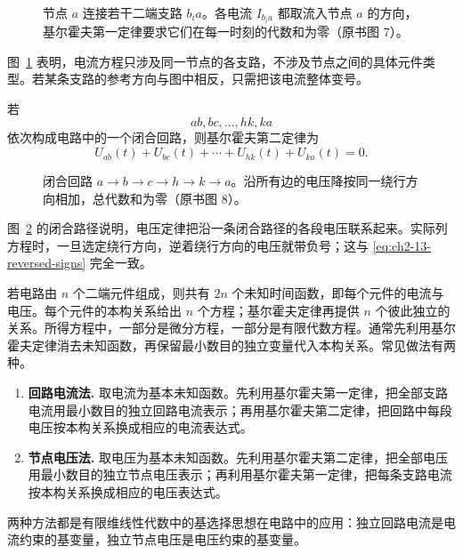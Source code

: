 \begin{figure}[H]
 \centering
 \resizebox{0.55\textwidth}{!}{}
 \caption{节点 \(a\) 连接若干二端支路 \(b_i a\)。各电流 \(I_{b_i a}\) 都取流入节点 \(a\) 的方向，基尔霍夫第一定律要求它们在每一时刻的代数和为零（原书图 7）。}
 \label{fig:ch2-13-kcl}
\end{figure}

图~\ref{fig:ch2-13-kcl} 表明，电流方程只涉及同一节点的各支路，不涉及节点之间的具体元件类型。若某条支路的参考方向与图中相反，只需把该电流整体变号。

若
\[
 ab,bc,\ldots,hk,ka
\]
依次构成电路中的一个闭合回路，则基尔霍夫第二定律为
\begin{equation}
 U_{ab}(t)+U_{bc}(t)+\cdots+U_{hk}(t)+U_{ka}(t)=0.
 \label{eq:ch2-13-loop-voltage}
\end{equation}

\begin{figure}[H]
 \centering
 \resizebox{0.55\textwidth}{!}{}
 \caption{闭合回路 \(a\to b\to c\to h\to k\to a\)。沿所有边的电压降按同一绕行方向相加，总代数和为零（原书图 8）。}
 \label{fig:ch2-13-kvl}
\end{figure}

图~\ref{fig:ch2-13-kvl} 的闭合路径说明，电压定律把沿一条闭合路径的各段电压联系起来。实际列方程时，一旦选定绕行方向，逆着绕行方向的电压就带负号；这与 \eqref{eq:ch2-13-reversed-signs} 完全一致。

若电路由 \(n\) 个二端元件组成，则共有 \(2n\) 个未知时间函数，即每个元件的电流与电压。每个元件的本构关系给出 \(n\) 个方程；基尔霍夫定律再提供 \(n\) 个彼此独立的关系。所得方程中，一部分是微分方程，一部分是有限代数方程。通常先利用基尔霍夫定律消去未知函数，再保留最小数目的独立变量代入本构关系。常见做法有两种。

\begin{enumerate}[label=\arabic*.]
 \item \textbf{回路电流法.} 取电流为基本未知函数。先利用基尔霍夫第一定律，把全部支路电流用最小数目的独立回路电流表示；再用基尔霍夫第二定律，把回路中每段电压按本构关系换成相应的电流表达式。
 \item \textbf{节点电压法.} 取电压为基本未知函数。先利用基尔霍夫第二定律，把全部电压用最小数目的独立节点电压表示；再利用基尔霍夫第一定律，把每条支路电流按本构关系换成相应的电压表达式。
\end{enumerate}

两种方法都是有限维线性代数中的基选择思想在电路中的应用：独立回路电流是电流约束的基变量，独立节点电压是电压约束的基变量。

